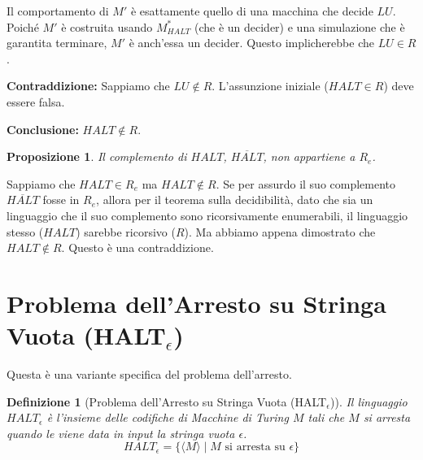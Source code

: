 \documentclass[a4paper]{article}
\makeatletter
\newtheorem{definition}{Definizione}[section] %
\newtheorem{proposition}{Proposizione}[section]
\renewenvironment{proof}[1][\proofname]{\par
  \pushQED{\qed}%
  \normalfont \topsep6\p@\@plus6\p@\relax
  \trivlist
  \item[\hskip\labelsep
        \bfseries
    #1\@addpunct{.}]\ignorespaces
}{%
  \popQED\endtrivlist\@endpefalse
}
\makeatother
\begin{document}
\begin{proof}
Il comportamento di $M'$ è esattamente quello di una macchina che decide $LU$. Poiché $M'$ è costruita usando $M_{HALT}^*$ (che è un decider) e una simulazione che è garantita terminare, $M'$ è anch'essa un decider. Questo implicherebbe che $LU \in R$.

\textbf{Contraddizione:} Sappiamo che $LU \notin R$.
L'assunzione iniziale ($HALT \in R$) deve essere falsa.

\textbf{Conclusione:} $HALT \notin R$.
\end{proof}

\begin{proposition}
Il complemento di $HALT$, $\overline{HALT}$, non appartiene a $R_e$.
\end{proposition}
\begin{proof}
Sappiamo che $HALT \in R_e$ ma $HALT \notin R$. Se per assurdo il suo complemento $\overline{HALT}$ fosse in $R_e$, allora per il teorema sulla decidibilità, dato che sia un linguaggio che il suo complemento sono ricorsivamente enumerabili, il linguaggio stesso ($HALT$) sarebbe ricorsivo ($R$). Ma abbiamo appena dimostrato che $HALT \notin R$. Questo è una contraddizione.
\end{proof}

\section{Problema dell'Arresto su Stringa Vuota (HALT$_\epsilon$)}
Questa è una variante specifica del problema dell'arresto.
\begin{definition}[Problema dell'Arresto su Stringa Vuota (HALT$_\epsilon$)]
Il linguaggio $HALT_\epsilon$ è l'insieme delle codifiche di Macchine di Turing $M$ tali che $M$ si arresta quando le viene data in input la stringa vuota $\epsilon$.
\[ HALT_\epsilon = \{ \langle M \rangle \mid M \text{ si arresta su } \epsilon \} \]
\end{definition}
\end{document}
